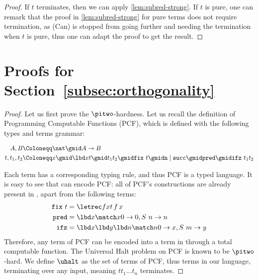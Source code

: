 \subred*

\begin{proof}
  If $t$ terminates, then we can apply \autoref{lem:subred-strong}.
  If $t$ is pure, one can remark that the proof in \autoref{lem:subred-strong}
  for pure terms does not require termination, as (Can) is stopped from
  going further and needing the termination when $t$ is pure, thus one
  can adapt the proof to get the result.
\end{proof}

\section{Proofs for Section~\ref{subsec:orthogonality}}

\orthoundecide*

\begin{proof}
  Let us first prove the $\pitwo$-hardness.
  Let us recall the definition of Programming Computable
  Functions (PCF), which is defined with the following types and terms grammar:

  \[
    \begin{aligned}
      A, B &\Coloneqq \nat \gmid A \to B \\
      t, t_1, t_2 &\Coloneqq x \gmid \lbd x t \gmid t_1 t_2 \gmid
      \mathtt{fix}~t \gmid \mathtt n \mid \mathtt{succ} \gmid \mathtt{pred}
      \gmid \mathtt{ifz}~t_1 t_2
    \end{aligned}
  \]

  Each term has a corresponding typing rule, and thus PCF is a typed language.
  It is easy to see that \hyrql{} can encode PCF: all of PCF's constructions are
  already present in \hyrql{}, apart from the following terms:
  \[
    \begin{aligned}
      \mathtt{fix}~t &= \letrec f x t\,f\,x \\
      \mathtt{pred} &= \lbd x \match x {0 \to 0, S~n \to n} \\
      \mathtt{ifz} &= \lbd x \lbd y \lbd n \match n {0 \to x, S~m \to y}
    \end{aligned}
  \]
  Therefore, any term of PCF can be encoded into a term in \hyrql{}
  through a total computable function.
  The Universal Halt problem on PCF is known to be $\pitwo$-hard.
  We define $\uhalt$ as the set of terms of PCF, thus terms
  in our language, terminating over any input,
  meaning $t t_1 \dots t_n$ terminates.


\end{proof}
